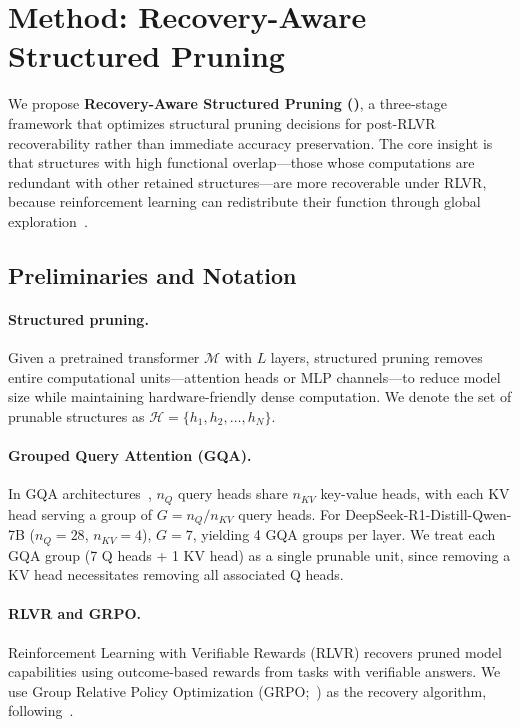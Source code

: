 \section{Method: Recovery-Aware Structured Pruning}
\label{sec:method}

We propose \textbf{Recovery-Aware Structured Pruning (\rasp{})}, a three-stage framework that optimizes structural pruning decisions for post-RLVR recoverability rather than immediate accuracy preservation.
The core insight is that structures with high functional overlap---those whose computations are redundant with other retained structures---are more recoverable under RLVR, because reinforcement learning can redistribute their function through global exploration~\citep{rlsqueezes2026}.

\subsection{Preliminaries and Notation}
\label{sec:prelim}

\paragraph{Structured pruning.}
Given a pretrained transformer $\mathcal{M}$ with $L$ layers, structured pruning removes entire computational units---attention heads or MLP channels---to reduce model size while maintaining hardware-friendly dense computation.
We denote the set of prunable structures as $\mathcal{H} = \{h_1, h_2, \ldots, h_N\}$.

\paragraph{Grouped Query Attention (GQA).}
In GQA architectures~\citep{ainslie2023gqa}, $n_Q$ query heads share $n_{KV}$ key-value heads, with each KV head serving a group of $G = n_Q / n_{KV}$ query heads.
For DeepSeek-R1-Distill-Qwen-7B ($n_Q{=}28$, $n_{KV}{=}4$), $G = 7$, yielding 4 GQA groups per layer.
We treat each GQA group (7 Q heads + 1 KV head) as a single prunable unit, since removing a KV head necessitates removing all associated Q heads.

\paragraph{RLVR and GRPO.}
Reinforcement Learning with Verifiable Rewards (RLVR) recovers pruned model capabilities using outcome-based rewards from tasks with verifiable answers.
We use Group Relative Policy Optimization (GRPO;~\citealp{shao2024grpo}) as the recovery algorithm, following~\citet{selfhealing2025}.

